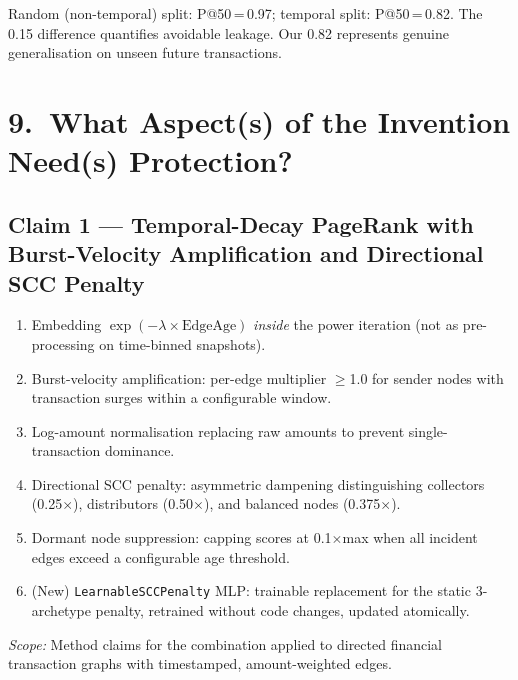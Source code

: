 \documentclass[12pt,a4paper]{article}
\begin{document}
Random (non-temporal) split: P@50\,=\,0.97; temporal split: P@50\,=\,0.82.
The 0.15 difference quantifies avoidable leakage. Our 0.82 represents genuine
generalisation on unseen future transactions.

\section{9.\ What Aspect(s) of the Invention Need(s) Protection?}

\subsection{Claim 1 --- Temporal-Decay PageRank with Burst-Velocity Amplification
            and Directional SCC Penalty}
\begin{enumerate}[label=1.\arabic*,leftmargin=2.5em,noitemsep]
  \item Embedding $\exp(-\lambda\times\text{EdgeAge})$ \emph{inside} the power iteration
        (not as pre-processing on time-binned snapshots).
  \item Burst-velocity amplification: per-edge multiplier $\geq$1.0 for sender nodes
        with transaction surges within a configurable window.
  \item Log-amount normalisation replacing raw amounts to prevent single-transaction dominance.
  \item Directional SCC penalty: asymmetric dampening distinguishing collectors (0.25$\times$),
        distributors (0.50$\times$), and balanced nodes (0.375$\times$).
  \item Dormant node suppression: capping scores at 0.1$\times$max when all incident
        edges exceed a configurable age threshold.
  \item (New) \texttt{LearnableSCCPenalty} MLP: trainable replacement for the static
        3-archetype penalty, retrained without code changes, updated atomically.
\end{enumerate}
\textit{Scope:} Method claims for the combination applied to directed financial
transaction graphs with timestamped, amount-weighted edges.
\end{document}
